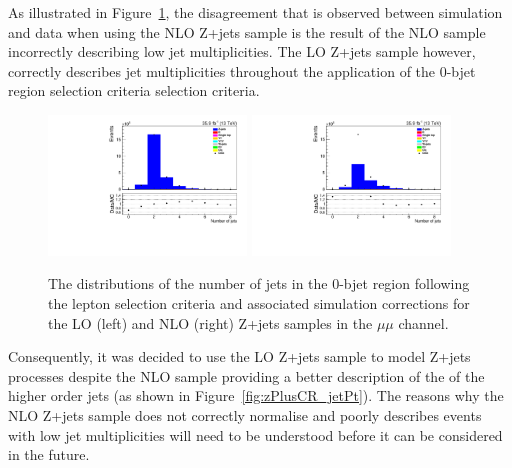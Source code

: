 As illustrated in Figure~\ref{fig:zPlusCR_nJets}, the disagreement that is observed between simulation and data when using the NLO Z+jets sample is the result of the NLO sample incorrectly describing low jet multiplicities.
The LO Z+jets sample however, correctly describes jet multiplicities throughout the application of the 0-bjet region selection criteria selection criteria.

\begin{figure}[htbp]
\centering
\includegraphics[width=0.47\textwidth]{figs/background-estimation/plots/unblinded/DY_control_old_prompt_mumu_ttbarInc/numbJets_SingleTop_lepSel_mumu.pdf}
\includegraphics[width=0.47\textwidth]{figs/background-estimation/plots/unblinded/DY_control_old_prompt_mumu_DYamcatnlo/numbJets_SingleTop_lepSel_mumu.pdf}
\caption{
The distributions of the number of jets in the 0-bjet region following the lepton selection criteria and associated simulation corrections for the LO (left) and NLO (right) Z+jets samples in the $\mu\mu$ channel.
}
\label{fig:zPlusCR_nJets}
\end{figure}

Consequently, it was decided to use the LO Z+jets sample to model Z+jets processes despite the NLO sample providing a better description of the \pT of the higher order jets (as shown in Figure~\ref{fig:zPlusCR_jetPt}).
The reasons why the NLO Z+jets sample does not correctly normalise and poorly describes events with low jet multiplicities will need to be understood before it can be considered in the future.

